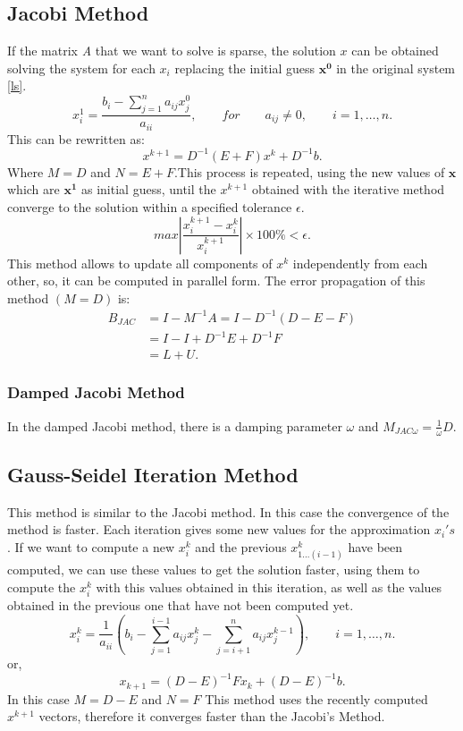 \documentclass[a4paper,10pt]{report}
\begin{document}
\subsection{Jacobi Method}
If the matrix \emph{A} that we want to solve is sparse, the solution $x$ can be obtained solving the system for each $x_i$
 replacing the initial guess $\mathbf{x^0}$ in the original system \eqref{ls}.
\begin{equation*}
x^1_i=\frac{b_i-\sum_{j=1}^n a_{ij}x^0_{j}}{a_{ii}},\qquad for\qquad a_{ij}\neq 0, \qquad i=1,\dots,n.
\end{equation*}
This can be rewritten as:
\begin{equation*}
 x^{k+1}=D^{-1}(E+F)x^k+D^{-1}b.
\end{equation*}
Where $M=D$ and $N=E+F$.This process is repeated, using the new values of $\mathbf{x}$ which are $\mathbf{x^1}$ as initial guess, until the $x^{k+1}$ obtained with
the iterative method converge to the solution within a specified tolerance $\epsilon$.
\begin{equation*}
max |\frac{x_i^{k+1}-x_i^k}{x_i^{k+1}}|\times 100 \% < \epsilon.
\end{equation*}
This method allows to update all components of $x^k$ independently from each other, so, it can be
computed in parallel form.
The error propagation of this method $(M=D)$ is:
\begin{align*}
 B_{JAC}&=I-M^{-1}A=I-D^{-1}(D-E-F)\\
 &=I-I+D^{-1}E+D^{-1}F\\
 &=L+U.
\end{align*}
\subsubsection{Damped Jacobi Method}
In the damped Jacobi method, there is a damping parameter $\omega$ and $M_{JAC\omega}=\frac{1}{\omega}D$.
\subsection{Gauss-Seidel Iteration Method}
This method is similar to the Jacobi method. In this case the convergence of the method is faster. Each iteration gives some new values for the approximation $x_i's$.
If we want to compute a new $x_i^k$ and the previous $x_{1...(i-1)}^k$ have been computed, we can use these values to get the solution faster, using them to compute the
$x_i^k$ with this values obtained in this iteration, as well as the values obtained in the previous one that have not been computed yet.
\begin{equation*}
x^k_i=\frac{1}{a_{ii}}(b_i-\sum_{j=1}^{i-1}a_{ij}x_{j}^{k}-\sum_{j=i+1}^{n}a_{ij}x_{j}^{k-1}), \qquad i=1,\dots,n.
\end{equation*}
or,
\begin{equation*}
 x_{k+1}=(D-E)^{-1}Fx_k+(D-E)^{-1}b.
\end{equation*}
In this case $M=D-E$ and $N=F$
This method uses the recently computed $x^{k+1}$ vectors, therefore it converges faster than the Jacobi's Method.
\end{document}
